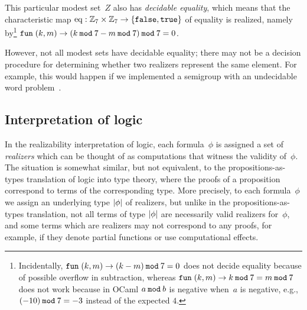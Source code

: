 This particular modest set~$Z$ also has \emph{decidable equality},
which means that the characteristic map $\mathrm{eq} : \mathbb{Z}_7 \times
\mathbb{Z}_7 \to \{\mathtt{false}, \mathtt{true}\}$ of equality is
realized, namely by\footnote{Incidentally, $\mathtt{fun}\;(k,m) \to (k - m) \mathbin{\mathtt{mod}}
    7 = 0$ does not decide equality because of possible overflow in
  subtraction, whereas $\mathtt{fun}\;(k,m) \to k \mathbin{\mathtt{mod}} 7 = m \mathbin{\mathtt{mod}} 7$ does not
  work because in OCaml $a \mathbin{\mathtt{mod}} b$ is negative when~$a$ is negative,
  e.g., $(-10) \mathbin{\mathtt{mod}} 7 = -3$ instead of the expected $4$.}
$\mathtt{fun}\;(k,m) \to (k \mathbin{\mathtt{mod}} 7 - m \mathbin{\mathtt{mod}} 7) \mathbin{\mathtt{mod}} 7 = 0$.

However, not all modest sets have decidable
equality; there may not be a decision procedure for determining
whether two realizers represent the same element. For example, this
would happen if we implemented a semigroup with an undecidable word
problem~\cite{post47:_recur_unsol_probl_thue}.


\subsection{Interpretation of logic}
\label{sec:interpretation-logic}

In the realizability interpretation of logic, each formula~$\phi$ is
assigned a set of \emph{realizers} which can be thought of as
computations that witness the validity of~$\phi$. The situation is
somewhat similar, but not equivalent, to the propositions-as-types
translation of logic into type theory, where the proofs of a
proposition correspond to terms of the corresponding type. More
precisely, to each formula~$\phi$ we assign an underlying type
$|\phi|$ of realizers, but unlike in the propositions-as-types
translation, not all terms of type $|\phi|$ are necessarily
valid realizers for~$\phi$, and some terms which are realizers may not
correspond to any proofs, for example, if they denote partial
functions or use computational effects.

